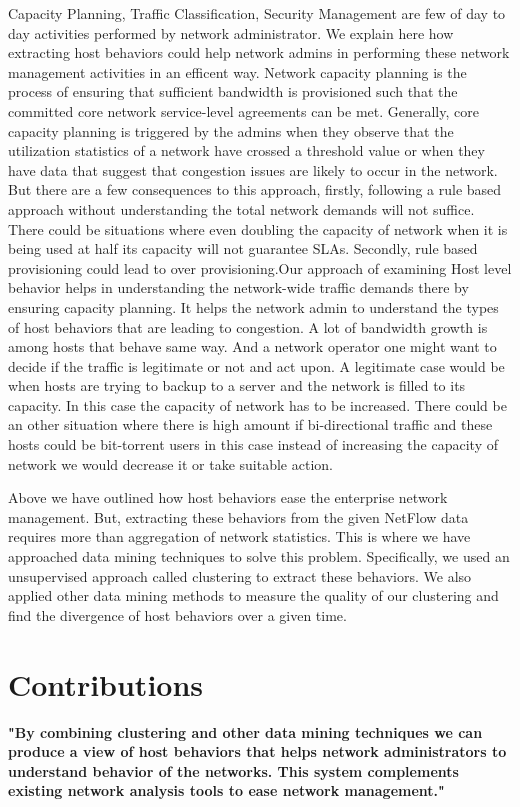 Capacity Planning, Traffic Classification, Security Management are few of day to day activities performed by network administrator. We explain here how extracting host behaviors could help network admins in performing these network management activities in an efficent way. Network capacity planning is the process of ensuring that sufficient bandwidth is provisioned such that the committed core network service-level agreements can be met. Generally, core capacity planning is triggered by the admins when they observe that the utilization statistics of a network have crossed a threshold value or when they have data that suggest that congestion issues are likely to occur in the network. But there are a few consequences to this approach, firstly, following a rule based approach without understanding the total network demands will not suffice. There could be situations where even doubling the capacity of network when it is being used at half its capacity will not guarantee SLAs. Secondly, rule based provisioning could lead to over provisioning.Our approach of examining Host level behavior helps in understanding the network-wide traffic demands there by ensuring capacity planning. It helps the network admin to understand the types of host behaviors that are leading to congestion. A lot of bandwidth growth is among hosts that behave same way. And a network operator one might want to decide if the traffic is legitimate or not and act upon. A legitimate case would be when hosts are trying to backup to a server and the network is filled to its capacity. In this case the capacity of network has to be increased. There could be an other situation where there is high amount if bi-directional traffic and these hosts could be bit-torrent users in this case instead of increasing the capacity of network we would decrease it or take suitable action.

Above we have outlined how host behaviors ease the enterprise network management. But, extracting these behaviors from the given NetFlow data requires more than aggregation of network statistics. This is where we have approached data mining techniques to solve this problem. Specifically, we used an unsupervised approach called clustering to extract these behaviors. We also applied other data mining methods to measure the quality of our clustering and find the divergence of host behaviors over a given time.  


\section{Contributions}
\textbf{"By combining clustering and other data mining techniques we can produce a view of host behaviors that helps network administrators to understand behavior of the networks. This system complements existing network analysis tools to ease network management."}

